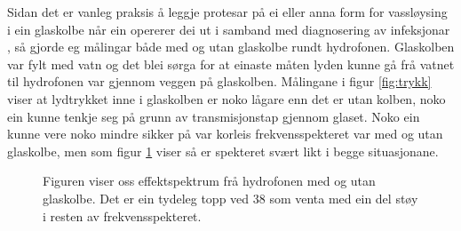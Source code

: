 Sidan det er vanleg praksis å leggje protesar på ei eller anna form for vassløysing i ein glaskolbe når ein opererer dei ut i samband med diagnosering av infeksjonar \cite{ultraprotese}, så gjorde eg målingar både med og utan glaskolbe rundt hydrofonen. Glaskolben var fylt med vatn og det blei sørga for at einaste måten lyden kunne gå frå vatnet til hydrofonen var gjennom veggen på glaskolben. Målingane i figur \ref{fig:trykk} viser at lydtrykket inne i glaskolben er noko lågare enn det er utan kolben, noko ein kunne tenkje seg på grunn av transmisjonstap gjennom glaset. Noko ein kunne vere noko mindre sikker på var korleis frekvensspekteret var med og utan glaskolbe, men som figur \ref{fig:effekt} viser så er spekteret svært likt i begge situasjonane.
\begin{figure}[!htbp]
	\centering
	\caption[Effektspektrum av hydrofon i måletank]{Figuren viser oss effektspektrum frå hydrofonen med og utan glaskolbe. Det er ein tydeleg topp ved \unit{38}{\kilo\hertz} som venta med ein del støy i resten av frekvensspekteret.}
	\label{fig:effekt}
\end{figure}